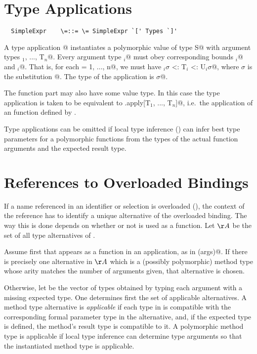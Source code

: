 \documentclass[11pt]{report}
\begin{document}
\section{Type Applications}
\label{sec:type-app}
\syntax\begin{verbatim}
  SimpleExpr    \=::= \= SimpleExpr `[' Types `]'
\end{verbatim}

A type application \verb@e[T$_1$, ..., T$_n$]@ instantiates a
polymorphic value \verb@e@ of type
\verb@[a$_1$ >: L$_1$ <: U$_1$, ..., a$_n$ >: L$_n$ <: U$_n$]S@ with
argument types \verb@T$_1$, ..., T$_n$@.  Every argument type
\verb@T$_i$@ must obey corresponding bounds \verb@L$_i$@ and
\verb@U$_i$@.  That is, for each \verb@i = 1, ..., n@, we must
have \verb@L$_i \sigma$ <: T$_i$ <: U$_i \sigma$@, where $\sigma$ is the
substitution \verb@[a$_1$ := T$_1$, ..., a$_n$ := T$_n$]@.  The type
of the application is \verb@S$\sigma$@.  

The function part \verb@e@ may also have some value type. In this case
the type application is taken to be equivalent to
\verb@e.apply[T$_1$, ..., T$_n$]@, i.e.\ the
application of an \verb@apply@ function defined by \verb@e@.

Type applications can be omitted if local type inference
() can infer best type parameters for a
polymorphic functions from the types of the actual function arguments
and the expected result type.

\section{References to Overloaded Bindings}
\label{sec:overloaded-refs}

If a name \verb@f@ referenced in an identifier or selection is
overloaded (), the context of the reference
has to identify a unique alternative of the overloaded binding. The
way this is done depends on whether or not \verb@f@ is used as a
function.  Let $\AA$ be the set of all type alternatives of
\verb@f@.

Assume first that \verb@f@ appears as a function in an application, as
in \verb@f(args)@.  If there is precisely one alternative in
$\AA$ which is a (possibly polymorphic) method type whose arity
matches the number of arguments given, that alternative is chosen.

Otherwise, let \verb@argtypes@ be the vector of types obtained by
typing each argument with a missing expected type. One determines
first the set of applicable alternatives. A method type alternative is
{\em applicable} if each type in \verb@argtypes@ is compatible with
the corresponding formal parameter type in the alternative, and, if 
the expected type is defined, the method's result type is compatible to
it.  A polymorphic method type is applicable if local type inference
can determine type arguments so that the instantiated method type is
applicable.
\end{document}
